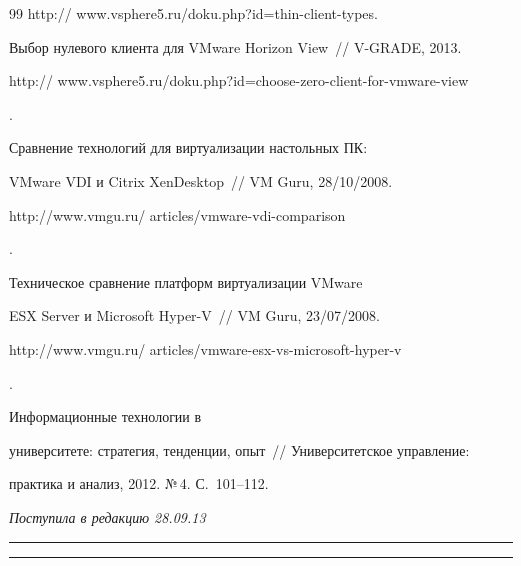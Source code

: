 {{\begin{thebibliography}{99}
{\sf http:// www.vsphere5.ru/doku.php?id=thin-client-types}.


Выбор нулевого клиента для VMware Horizon View~/\!\!/ V-GRADE, 2013. {\sf 

http:// www.vsphere5.ru/doku.php?id=choose-zero-client-for-vmware-view}.


 Сравнение технологий для виртуализации настольных ПК: 

VMware VDI и Citrix XenDesktop~/\!\!/ VM Guru, 28/10/2008. {\sf 

http://www.vmgu.ru/ articles/vmware-vdi-comparison}.


 Техническое сравнение платформ виртуализации VMware 

ESX Server и Microsoft Hyper-V~/\!\!/ VM Guru, 23/07/2008. {\sf 

http://www.vmgu.ru/ articles/vmware-esx-vs-microsoft-hyper-v}.


 Информационные технологии в 

университете: стратегия, тенденции, опыт~/\!\!/ Университетское управление: 

практика и анализ, 2012. №\,4. С.~101--112.



\end{thebibliography}

}

}



\vspace*{-9pt}



\hfill{\small\textit{Поступила в редакцию 28.09.13}}



\vspace*{12pt}



\hrule



\vspace*{2pt}



\hrule



\def\tit{DEPLOYMENT AND USAGE OF~DESKTOP VIRTUALIZATION AT~UNIVERSITY}



